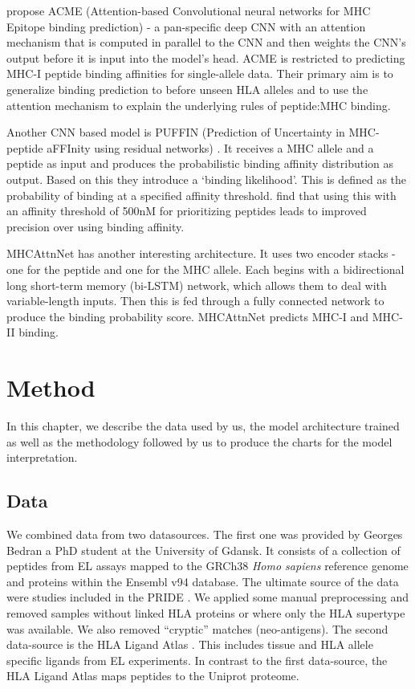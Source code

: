 \documentclass[msc,deptreport,ai]{infthesis} %
\begin{document}
	\cite{hu_acme_2019} propose ACME (Attention-based Convolutional neural networks for MHC Epitope binding prediction) - a pan-specific deep \gls{CNN} with an attention mechanism that is computed in parallel to the \gls{CNN}  and then weights the \gls{CNN}'s output before it is input into the model's head. ACME is restricted to predicting \gls{MHC-I} peptide binding affinities for single-allele data. Their primary aim is to generalize binding prediction to before unseen \gls{HLA} alleles and to use the attention mechanism to explain the underlying rules of peptide:MHC binding. 
	
	Another \gls{CNN} based model is PUFFIN (Prediction of Uncertainty in MHC-peptide aFFInity using residual networks) \cite{zeng_quantification_2019}. It receives a \gls{MHC} allele and a peptide as input and produces the probabilistic binding affinity distribution as output.  Based on this they introduce a `binding likelihood'. This is defined as the probability of binding at a specified affinity threshold.  \cite{zeng_quantification_2019} find that using this with an affinity threshold of 500nM for prioritizing peptides leads to improved precision over using binding affinity. 
	
	MHCAttnNet \cite{venkatesh_mhcattnnet_2020} has another interesting architecture. It uses two encoder stacks - one for the peptide and one for the \gls{MHC} allele. Each begins with a bidirectional long short-term memory (bi-LSTM) network, which allows them to deal with variable-length inputs. Then this is fed through a fully connected network to produce the binding probability score.  MHCAttnNet predicts \gls{MHC-I} and \gls{MHC-II} binding.


	
\chapter{Method}
\label{chapter:method}

	In this chapter, we describe the data used by us, the model architecture trained as well as the methodology followed by us to produce the charts for the model interpretation.

	\section{Data}
	\label{sec:Data}
		We combined data from two datasources. The first one was provided by Georges Bedran a PhD student at the University of Gdansk. It consists of a collection of peptides from \gls{EL} assays mapped to the GRCh38 \textit{Homo sapiens} reference genome and proteins within the Ensembl v94 database. The ultimate source of the data were studies included in the \gls{PRIDE} \cite{perez-riverol_pride_2019}. We applied some manual preprocessing and removed samples without linked \gls{HLA} proteins or where only the \gls{HLA} supertype was available. We also removed ``cryptic'' matches (neo-antigens). The second data-source is the HLA Ligand Atlas \cite{marcu_hla_2020}. This includes tissue and \gls{HLA} allele specific ligands from \gls{EL} experiments. In contrast to the first data-source, the HLA Ligand Atlas maps peptides to the Uniprot proteome. 
		
\end{document}
